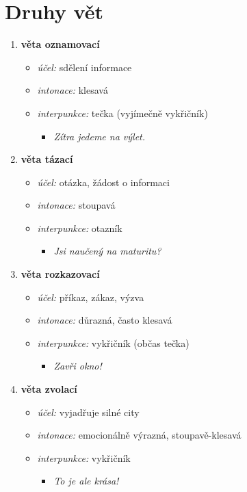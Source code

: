 \documentclass{memoir}
\begin{document}
\section*{Druhy vět}
	\begin{enumerate}
		\item \textbf{věta oznamovací}
		\begin{itemize}
			\item \textit{účel:} sdělení informace
			\item \textit{intonace:} klesavá
			\item \textit{interpunkce:} tečka (vyjímečně vykřičník)
			\begin{itemize}
				\item \textit{Zítra jedeme na výlet.}
			\end{itemize}
		\end{itemize}
		\item \textbf{věta tázací}
		\begin{itemize}
			\item \textit{účel:} otázka, žádost o informaci
			\item \textit{intonace:} stoupavá
			\item \textit{interpunkce:} otazník
			\begin{itemize}
				\item \textit{Jsi naučený na maturitu?}
			\end{itemize}
		\end{itemize}
		\item \textbf{věta rozkazovací}
		\begin{itemize}
			\item \textit{účel:} příkaz, zákaz, výzva
			\item \textit{intonace:} důrazná, často klesavá
			\item \textit{interpunkce:} vykřičník (občas tečka)
			\begin{itemize}
				\item \textit{Zavři okno!}
			\end{itemize}
		\end{itemize}
		\item \textbf{věta zvolací}
		\begin{itemize}
			\item \textit{účel:} vyjadřuje silné city
			\item \textit{intonace:} emocionálně výrazná, stoupavě-klesavá
			\item \textit{interpunkce:} vykřičník
			\begin{itemize}
				\item \textit{To je ale krása!}
			\end{itemize}
		\end{itemize}
	\end{enumerate}
\end{document}
